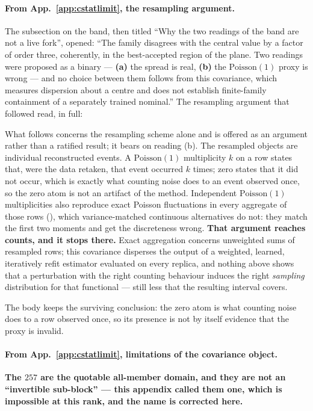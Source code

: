 \paragraph{From App.~\ref{app:cstatlimit}, the resampling argument.} The subsection on the band, then titled ``Why the two readings of the band are not a live fork'', opened: ``The family disagrees with the central value by a factor of order three, coherently, in the best-accepted region of the plane. Two readings were proposed as a binary --- \textbf{(a)} the spread is real, \textbf{(b)} the $\mathrm{Poisson}(1)$ proxy is wrong --- and no choice between them follows from this covariance, which measures dispersion about a centre and does not establish finite-family containment of a separately trained nominal.'' The resampling argument that followed read, in full:

What follows concerns the resampling scheme alone and is offered as an argument rather than a ratified result; it bears on reading (b). The resampled objects are individual reconstructed events. A $\mathrm{Poisson}(1)$ multiplicity $k$ on a row states that, were the data retaken, that event occurred $k$ times; zero states that it did not occur, which is exactly what counting noise does to an event observed once, so the zero atom is not an artifact of the method. Independent $\mathrm{Poisson}(1)$ multiplicities also reproduce exact Poisson fluctuations in every aggregate of those rows (), which variance-matched continuous alternatives do not: they match the first two moments and get the discreteness wrong. \textbf{That argument reaches counts, and it stops there.} Exact aggregation concerns unweighted sums of resampled rows; this covariance disperses the output of a weighted, learned, iteratively refit estimator evaluated on every replica, and nothing above shows that a perturbation with the right counting behaviour induces the right \emph{sampling} distribution for that functional --- still less that the resulting interval covers.

The body keeps the surviving conclusion: the zero atom is what counting noise does to a row observed once, so its presence is not by itself evidence that the proxy is invalid.

\paragraph{From App.~\ref{app:cstatlimit}, limitations of the covariance object.} \textbf{The $257$ are the quotable all-member domain, and they are not an ``invertible sub-block'' --- this appendix called them one, which is impossible at this rank, and the name is corrected here.}

